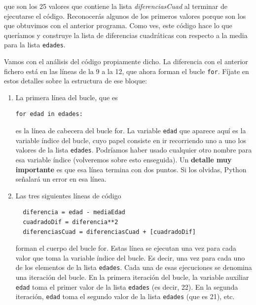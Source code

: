\documentclass[10pt,a4paper]{article}\usepackage[]{graphicx}\usepackage[]{color}
\makeatletter
\newenvironment{kframe}{%
 \def\at@end@of@kframe{}%
 \ifinner\ifhmode%
  \def\at@end@of@kframe{\end{minipage}}%
  \begin{minipage}{\columnwidth}%
 \fi\fi%
 \def\FrameCommand##1{\hskip\@totalleftmargin \hskip-\fboxsep
 \colorbox{shadecolor}{##1}\hskip-\fboxsep
     \hskip-\linewidth \hskip-\@totalleftmargin \hskip\columnwidth}%
 \MakeFramed {\advance\hsize-\width
   \@totalleftmargin\z@ \linewidth\hsize
   \@setminipage}}%
 {\par\unskip\endMakeFramed%
 \at@end@of@kframe}
\newenvironment{knitrout}{}{} %
\newcounter {cont01}
\makeatother
\begin{document}
que son los 25 valores que contiene la lista {\em diferenciasCuad} al terminar de ejecutarse el código. Reconocerás algunos de los primeros valores porque son los que obtuvimos con el anterior programa. Como ves, este código hace lo que queríamos y construye la lista de diferencias cuadráticas con respecto a la media para la lista {\tt edades}. 

Vamos con el análisis del código propiamente dicho. La diferencia con el anterior fichero está en las líneas de la 9 a la 12, que ahora forman el bucle {\tt for}. Fíjate en estos detalles sobre la estructura de ese bloque:  

\begin{enumerate}

\item La primera línea del bucle, que es
\begin{knitrout}
\color{fgcolor}\begin{kframe}
\begin{verbatim}
for edad in edades:
\end{verbatim}
\end{kframe}
\end{knitrout}
es la {\sf línea de cabecera del bucle for}. La variable {\tt edad} que aparece aquí es la {\sf variable índice} del bucle, cuyo papel consiste en ir recorriendo uno a uno los valores de la lista {\tt edades}. Podríamos haber usado cualquier otro nombre para esa variable índice (volveremos sobre esto enseguida). Un {\bf detalle muy importante} es que esa línea termina con dos puntos. Si los olvidas, Python señalará un error en esa línea. 

\item Las tres siguientes líneas de código
\begin{knitrout}
\color{fgcolor}\begin{kframe}
\begin{verbatim}
  diferencia = edad - mediaEdad
  cuadradoDif = diferencia**2
  diferenciasCuad = diferenciasCuad + [cuadradoDif]
\end{verbatim}
\end{kframe}
\end{knitrout}
forman el {\sf cuerpo del bucle for}. Estas línea se ejecutan una vez para cada valor que toma la variable índice del bucle. Es decir, una vez para cada uno de los elementos de la lista {\tt edades}. Cada una de esas ejecuciones se denomina una {\sf iteración} del bucle. En la primera iteración del bucle, la variable auxiliar {\tt edad} toma el primer valor de la lista {\tt edades} (es decir, 22). En la segunda iteración, {\tt edad} toma el segundo valor de la lista {\tt edades} (que es 21), etc. 


\end{enumerate}
\end{document}
